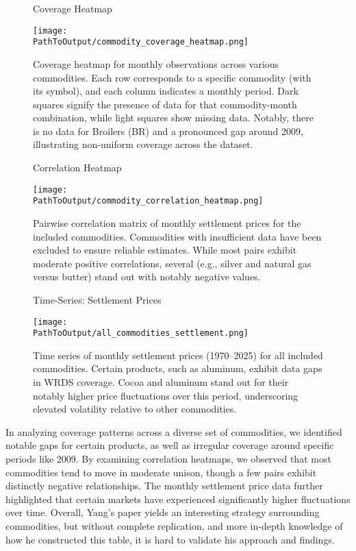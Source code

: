 \documentclass[12pt]{article}
\begin{document}
\begin{figure}[ht!]
  \centering
  \caption{Coverage Heatmap}
  \begin{adjustbox}{max width=\textwidth}
  \texttt{[image: \\PathToOutput/commodity\_coverage\_heatmap.png]}
  \end{adjustbox}
  \caption*{Coverage heatmap for monthly observations across various commodities. 
  Each row corresponds to a specific commodity (with its symbol), and each column 
  indicates a monthly period. Dark squares signify the presence of data for that commodity-month 
  combination, while light squares show missing data. Notably, there is no data for Broilers (BR) 
  and a pronounced gap around 2009, illustrating non-uniform coverage across the dataset.}
  \label{fig:commodity_coverage_heatmap}
\end{figure}


\begin{figure}[ht!]
  \centering
  \caption{Correlation Heatmap}
  \begin{adjustbox}{max width=\textwidth}
  \texttt{[image: \\PathToOutput/commodity\_correlation\_heatmap.png]}
  \end{adjustbox}
  \caption*{Pairwise correlation matrix of monthly settlement prices for the included commodities. Commodities 
  with insufficient data have been excluded to ensure reliable estimates. While most pairs exhibit moderate 
  positive correlations, several (e.g., silver and natural gas versus butter) stand out with notably negative values.}
\end{figure}

\clearpage
\begin{figure}[ht!]
  \centering
  \caption{Time-Series: Settlement Prices}
  \begin{adjustbox}{max width=\textwidth}
  \texttt{[image: \\PathToOutput/all\_commodities\_settlement.png]}
  \end{adjustbox}
  \caption*{Time series of monthly settlement prices (1970–2025) for all included commodities. 
  Certain products, such as aluminum, exhibit data gaps in WRDS coverage. Cocoa and aluminum 
  stand out for their notably higher price fluctuations over this period, underscoring elevated 
  volatility relative to other commodities.}
  \label{fig:all_commodities_settlement}
\end{figure}  

\FloatBarrier

In analyzing coverage patterns across a diverse set of commodities, we identified notable gaps 
for certain products, as well as irregular coverage around specific periods like 2009. By examining 
correlation heatmaps, we observed that most commodities tend to move in moderate unison, though a few pairs 
exhibit distinctly negative relationships. The monthly settlement price data further highlighted that certain 
markets have experienced significantly higher fluctuations over time. Overall, Yang's paper yields an interesting 
strategy surrounding commodities, but without complete replication, and more in-depth knowledge of how he constructed
this table, it is hard to validate his approach and findings. 

\clearpage




\end{document}
